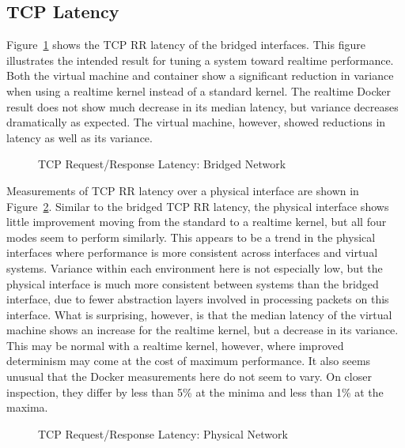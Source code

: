 \subsection{TCP Latency} %
\label{sub:tcplatency}
Figure~\ref{fig:tcp_rr_bridge} shows the TCP RR latency of the bridged interfaces.
This figure illustrates the intended result for tuning a system toward realtime performance.
Both the virtual machine and container show a significant reduction in variance when using a realtime kernel instead of a standard kernel.
The realtime Docker result does not show much decrease in its median latency, but variance decreases dramatically as expected.
The virtual machine, however, showed reductions in latency as well as its variance.

\begin{figure}
    \centering
    \def\svgwidth{\columnwidth}
    
    \caption{TCP Request/Response Latency: Bridged Network}
    \label{fig:tcp_rr_bridge}
\end{figure}

Measurements of TCP RR latency over a physical interface are shown in Figure~\ref{fig:tcp_rr_phys}.  
Similar to the bridged TCP RR latency, the physical interface shows little improvement moving from the standard to a realtime kernel, but all four modes seem to perform similarly.
This appears to be a trend in the physical interfaces where performance is more consistent across interfaces and virtual systems.
Variance within each environment here is not especially low, but the physical interface is much more consistent between systems than the bridged interface, due to fewer abstraction layers involved in processing packets on this interface. 
What is surprising, however, is that the median latency of the virtual machine shows an increase for the realtime kernel, but a decrease in its variance.  
This may be normal with a realtime kernel, however, where improved determinism may come at the cost of maximum performance.  
It also seems unusual that the Docker measurements here do not seem to vary.  
On closer inspection, they differ by less than 5\% at the minima and less than 1\% at the maxima.

\begin{figure}
    \centering
    \def\svgwidth{\columnwidth}
    
    \caption{TCP Request/Response Latency: Physical Network}
    \label{fig:tcp_rr_phys}
\end{figure}


